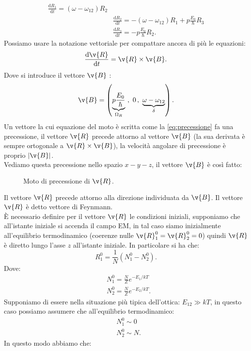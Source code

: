 \[\begin{aligned}
    \frac{\text{d} R_1}{\text{d} t} = \left(\omega-\omega_{12}\right)R_2\\
    & \frac{\text{d} R_2}{\text{d} t} = -\left(\omega-\omega_{12}\right)R_1+
    p \frac{E_0}{\hbar }R_3\\
    &\frac{\text{d} R_3}{\text{d} t} =-p \frac{E_0}{\hbar }R_2
.\end{aligned}\]
Possiamo usare la notazione vettoriale per compattare ancora di più le equazioni:
\[
    \frac{\text{d} \v{R}}{\text{d} t} = \v{R} \times \v{B} 
    \label{eq:precessione}
.\] 
Dove si introduce il vettore $\v{B}$ :
\[
    \v{B} = \left(\underbrace{p \frac{E_0}{\hbar}}_{\Omega_R} \ , \  0 \,
    ,\ \underbrace{\omega-\omega_{12}}_{\delta}\right)
.\] 
Un vettore la cui equazione del moto è scritta come la \ref{eq:precessione} fa una precessione, il vettore $\v{R}$ precede attorno al vettore $\v{B}$ (la sua derivata è sempre ortogonale a $\v{R}\times \v{B}$), la velocità angolare di precessione è proprio $\left|\v{B}\right|$. \\
Vediamo questa precessione nello spazio $x-y-z$, il vettore $\v{B}$ è così fatto:
\begin{figure}[H]
    \centering
    \caption{Moto di precessione di $\v{R}$.}
    \label{fig:vettore-b-della-precessione}
\end{figure}
\noindent
Il vettore $\v{R}$ precede attorno alla direzione individuata da $\v{B}$. Il vettore $\v{R}$ è detto vettore di Feynmann.\\
È necessario definire per il vettore $\v{R}$ le condizioni iniziali, supponiamo che all'istante iniziale si accenda il campo EM, in tal caso siamo inizialmente all'equilibrio termodinamico (coerenze nulle $\v{R}_1^0 = \v{R}_2^0=0$) quindi $\v{R}$ è diretto lungo l'asse $z$ all'istante iniziale.
In particolare si ha che:
\[
    R_1^0 = \frac{1}{N}\left(N_1^0 -N_2^0\right)
.\] 
Dove:
\[\begin{aligned}
    &N_1^0 = \frac{N}{Z}e^{-E_1 /kT}\\
    &N_2^0 = \frac{N}{Z}e^{-E_2 /kT}
.\end{aligned}\]
Supponiamo di essere nella situazione più tipica dell'ottica: $E_{12}\gg kT$, in questo caso possiamo assumere che all'equilibrio termodinamico:
\[\begin{aligned}
&N_1^0\sim 0\\
&N_2^0 \sim N
.\end{aligned}\]
In questo modo abbiamo che:
